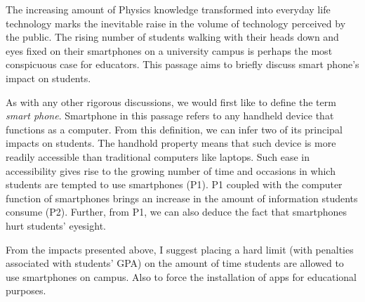 \documentclass[a4paper,12pt]{article}
\begin{document}
The increasing amount of Physics knowledge transformed into everyday life technology marks the inevitable raise in the volume of technology perceived by the public. The rising number of students walking with their heads down and eyes fixed on their smartphones on a university campus is perhaps the most conspicuous case for educators. This passage aims to briefly discuss smart phone's impact on students.

As with any other rigorous discussions, we would first like to define the term \textit{smart phone}. Smartphone in this passage refers to any handheld device that functions as a computer. From this definition, we can infer two of its principal impacts on students. The handhold property means that such device is more readily accessible than traditional computers like laptops. Such ease in accessibility gives rise to the growing number of time and occasions in which students are tempted to use smartphones (P1). P1 coupled with the computer function of smartphones brings an increase in the amount of information students consume (P2). Further, from P1, we can also deduce the fact that smartphones hurt students' eyesight.

From the impacts presented above, I suggest placing a hard limit (with penalties associated with students' GPA) on the amount of time students are allowed to use smartphones on campus. Also to force the installation of apps for educational purposes.
\end{document}
